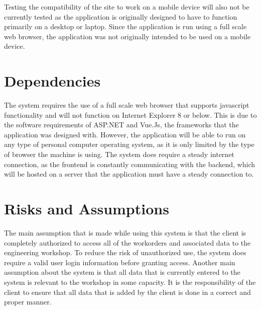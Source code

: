 {{{{{{Testing the compatibility of the site to work on a mobile device will also not be currently tested as the application is originally designed to have to function primarily on a desktop or laptop. Since the application is run using a full scale web browser, the application was not originally intended to be used on a mobile device.

\section{Dependencies}
The system requires the use of a full scale web browser that supports javascript functionality and will not function on Internet Explorer 8 or below. This is due to the software requirements of ASP.NET and Vue.Js, the frameworks that the application was designed with. However, the application will be able to run on any type of personal computer operating system, as it is only limited by the type of browser the machine is using. The system does require a steady internet connection, as the frontend is constantly communicating with the backend, which will be hosted on a server that the application must have a steady connection to. 

\section{Risks and Assumptions}
The main assumption that is made while using this system is that the client is completely authorized to access all of the workorders and associated data to the engineering workshop. To reduce the risk of unauthorized use, the system does require a valid user login information before granting access. Another main assumption about the system is that all data that is currently entered to the system is relevant to the workshop in some capacity. It is the responsibility of the client to ensure that all data that is added by the client is done in a correct and proper manner.  

}}}}}}
